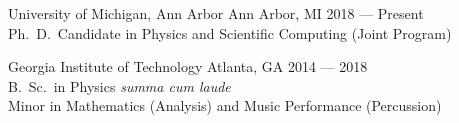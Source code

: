 
\begin{minipage}[t]{0.2\textwidth}
	\flushleft
\end{minipage}
\begin{minipage}[t]{0.8\textwidth}
	\education
	{University of Michigan, Ann Arbor}
	{Ann Arbor, MI}
	{
  2018 --- Present\\
	Ph.\ D.\ Candidate in Physics and Scientific Computing (Joint Program)
  }

  \vspace*{4pt}

	\education
	{Georgia Institute of Technology}
	{Atlanta, GA}
	{
  2014 --- 2018\\
	B.\ Sc.\ in Physics \textit{summa cum laude}\\
  Minor in Mathematics (Analysis) and Music Performance (Percussion)
  }
\end{minipage}

\vspace*{8pt}
